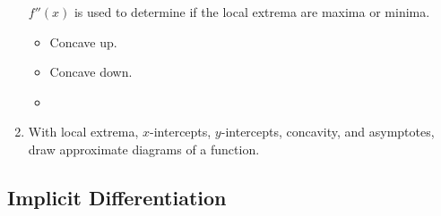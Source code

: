 \documentclass[12pt, a4paper]{article}
\begin{document}
\begin{enumerate}
    $f''(x)$ is used to determine if the local extrema are maxima or minima.
    \begin{itemize}
        \item {\color{red}{Minima: $f''(x)>0$}} Concave up.
        \item {\color{red}{Maxima: $f''(x)<0$}} Concave down.
        \item {}
    \end{itemize}
    \item With local extrema, $x$-intercepts, $y$-intercepts, concavity, and asymptotes, draw approximate diagrams of a function.
\end{enumerate}

\subsection{Implicit Differentiation}
\end{document}
